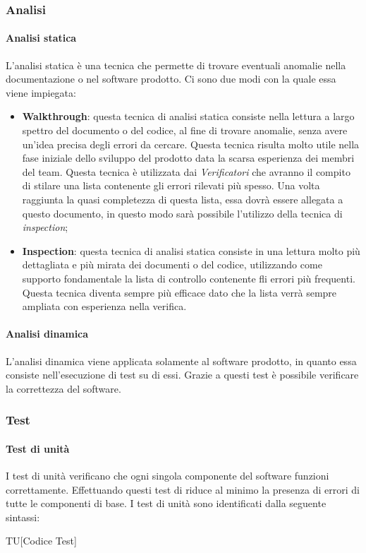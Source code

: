 \subsubsection{Analisi}
\paragraph{Analisi statica}
L'analisi statica è una tecnica che permette di trovare eventuali anomalie nella 
documentazione o nel software prodotto. Ci sono due modi con la quale essa viene 
impiegata:
\begin{itemize}
  \item \textbf{Walkthrough}: questa tecnica di analisi statica consiste nella 
  lettura a largo spettro del documento o del codice, al fine di trovare anomalie, 
  senza avere un'idea precisa degli errori da cercare. Questa tecnica risulta 
  molto utile nella fase iniziale dello sviluppo del prodotto data la scarsa 
  esperienza dei membri del team. Questa tecnica è utilizzata dai \textit{Verificatori} 
  che avranno il compito di stilare una lista contenente gli errori rilevati più 
  spesso. Una volta raggiunta la quasi completezza di questa lista, essa dovrà 
  essere allegata a questo documento, in questo modo sarà possibile l'utilizzo 
  della tecnica di \textit{inspection};
  \item \textbf{Inspection}: questa tecnica di analisi statica consiste in una 
  lettura molto più dettagliata e più mirata dei documenti o del codice, 
  utilizzando come supporto fondamentale la lista di controllo contenente fli 
  errori più frequenti. Questa tecnica diventa sempre più efficace dato che la 
  lista verrà sempre ampliata con esperienza nella verifica.
\end{itemize}
\paragraph{Analisi dinamica}
L'analisi dinamica viene applicata solamente al software prodotto, in quanto 
essa consiste nell'esecuzione di test su di essi. Grazie a questi test è 
possibile verificare la correttezza del software.
\subsubsection{Test}
\paragraph{Test di unità}
I test di unità verificano che ogni singola componente del software funzioni 
correttamente. Effettuando questi test di riduce al minimo la presenza di errori 
di tutte le componenti di base. I test di unità sono identificati dalla seguente 
sintassi:
\begin{center}
  TU[Codice Test]
\end{center}
